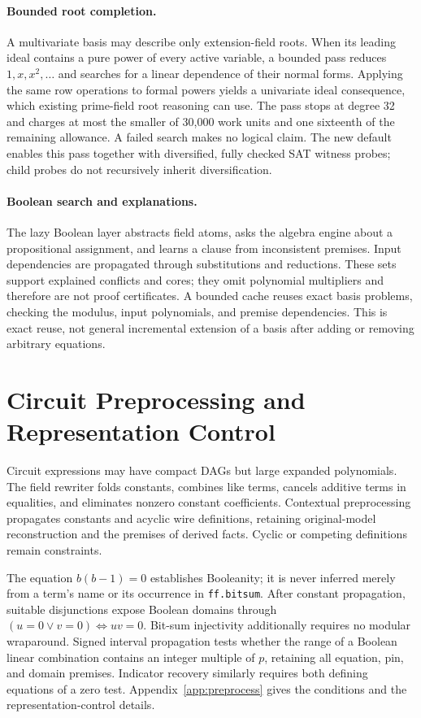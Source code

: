 \documentclass[runningheads]{llncs}
\newcommand{\flag}[1]{\texttt{#1}}
\begin{document}
\paragraph{Bounded root completion.}
A multivariate basis may describe only extension-field roots. When its leading
ideal contains a pure power of every active variable, a bounded pass reduces
$1,x,x^2,\ldots$ and searches for a linear dependence of their normal forms.
Applying the same row operations to formal powers yields a univariate ideal
consequence, which existing prime-field root reasoning can use. The pass stops
at degree 32 and charges at most the smaller of 30,000 work units and one
sixteenth of the remaining allowance. A failed search makes no logical claim.
The new default enables this pass together with diversified, fully checked SAT
witness probes; child probes do not recursively inherit diversification.

\paragraph{Boolean search and explanations.}
The lazy Boolean layer abstracts field atoms, asks the algebra engine about a
propositional assignment, and learns a clause from inconsistent premises.
Input dependencies are propagated through substitutions and reductions. These
sets support explained conflicts and cores; they omit polynomial multipliers
and therefore are not proof certificates. A bounded cache reuses exact basis
problems, checking the modulus, input polynomials, and premise dependencies.
This is exact reuse, not general incremental extension of a basis after adding
or removing arbitrary equations.

\section{Circuit Preprocessing and Representation Control}
\label{sec:preprocess}

Circuit expressions may have compact DAGs but large expanded polynomials.
The field rewriter folds constants, combines like terms, cancels additive terms
in equalities, and eliminates nonzero constant coefficients. Contextual
preprocessing propagates constants and acyclic wire definitions, retaining
original-model reconstruction and the premises of derived facts. Cyclic or
competing definitions remain constraints.

The equation $b(b-1)=0$ establishes Booleanity; it is never inferred merely
from a term's name or its occurrence in \flag{ff.bitsum}. After constant
propagation, suitable disjunctions expose Boolean domains through
$(u=0\lor v=0)\Leftrightarrow uv=0$. Bit-sum injectivity additionally requires
no modular wraparound. Signed interval propagation tests whether the range of
a Boolean linear combination contains an integer multiple of $p$, retaining
all equation, pin, and domain premises. Indicator recovery similarly requires
both defining equations of a zero test. Appendix~\ref{app:preprocess} gives
the conditions and the representation-control details.
\end{document}
